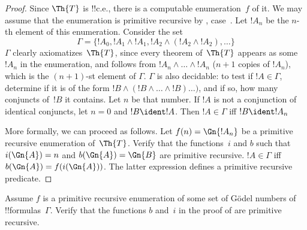 \documentclass[../../../include/open-logic-section]{subfiles}
\begin{document}
\begin{proof}
  Since $\Th{T}$ is !!{c.e.}, there is a computable enumeration~$f$ of
  it. We may assume that the enumeration is primitive recursive by
  ,
  case~. Let $!A_n$ be the $n$-th
  element of this enumeration. Consider the
  set
  \[
  \Gamma = \{!A_0, !A_1 \land !A_1, !A_2 \land (!A_2 \land !A_2), \dots\}
  \]
  $\Gamma$ clearly axiomatizes~$\Th{T}$, since every theorem
  of~$\Th{T}$ appears as some $!A_n$ in the enumeration, and follows
  from $!A_n \land \dots \land !A_n$ ($n+1$ copies of $!A_n$), which
  is the $(n+1)$-st element of $\Gamma$. $\Gamma$ is also decidable: to
  test if $!A \in \Gamma$, determine if it is of the form $!B \land
  (!B \land \dots \land !B)\dots)$, and if so, how many conjuncts
  of~$!B$ it contains. Let $n$ be that number. If $!A$ is not a
  conjunction of identical conjuncts, let $n=0$ and $!B \ident !A$.
  Then $!A \in \Gamma$ iff $!B \ident !A_{n}$

  More formally, we can proceed as follows. Let  $f(n) = \Gn{!A_n}$ be
  a primitive recursive enumeration of~$\Th{T}$. Verify that the
  functions~$i$ and $b$ such that $i(\Gn{A}) = n$ and $b(\Gn{A}) =
  \Gn{B}$ are primitive recursive. $!A \in \Gamma$ iff $b(\Gn{A}) =
  f(i(\Gn{A}))$. The latter expression defines a primitive recursive
  predicate.
\end{proof}

\begin{prob}
  Assume $f$ is a primitive recursive enumeration of some set of
  G\"odel numbers of !!{formula}s~$\Gamma$. Verify that the functions $b$
  and~$i$ in the proof of  are primitive recursive.
\end{prob}
\end{document}
